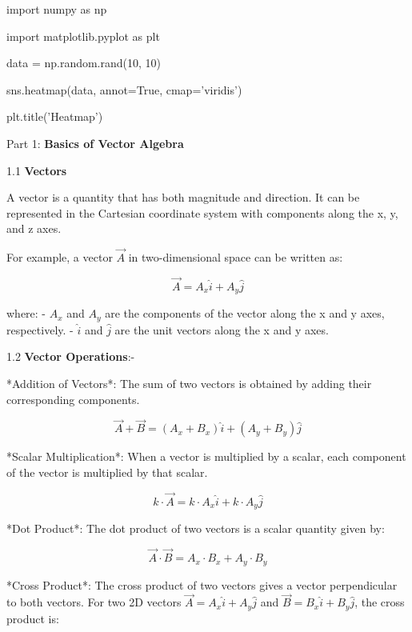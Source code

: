 \documentclass{report}
\begin{document}
import numpy as np

import matplotlib.pyplot as plt



data = np.random.rand(10, 10)


sns.heatmap(data, annot=True, cmap='viridis')

plt.title('Heatmap')





\setlength{\parskip}{1em}



Part 1: \textbf{Basics of Vector Algebra}

\setlength{\parskip}{1em}

 1.1 \textbf{Vectors}


A vector is a quantity that has both magnitude and direction. It can be represented in the Cartesian coordinate system with components along the x, y, and z axes. 

For example, a vector \(\vec{A}\) in two-dimensional space can be written as:

\[
\vec{A} = A_x \hat{i} + A_y \hat{j}
\]

where:
- \( A_x \) and \( A_y \) are the components of the vector along the x and y axes, respectively.
- \(\hat{i}\) and \(\hat{j}\) are the unit vectors along the x and y axes.


\setlength{\parskip}{1em}


1.2 \textbf{Vector Operations}:-



*Addition of Vectors*: The sum of two vectors is obtained by adding their corresponding components.

\[
\vec{A} + \vec{B} = (A_x + B_x) \hat{i} + (A_y + B_y) \hat{j}
\]

*Scalar Multiplication*: When a vector is multiplied by a scalar, each component of the vector is multiplied by that scalar.

\[
k \cdot \vec{A} = k \cdot A_x \hat{i} + k \cdot A_y \hat{j}
\]

*Dot Product*: The dot product of two vectors is a scalar quantity given by:

\[
\vec{A} \cdot \vec{B} = A_x \cdot B_x + A_y \cdot B_y
\]

*Cross Product*: The cross product of two vectors gives a vector perpendicular to both vectors. For two 2D vectors \(\vec{A} = A_x \hat{i} + A_y \hat{j}\) and \(\vec{B} = B_x \hat{i} + B_y \hat{j}\), the cross product is:
\end{document}

